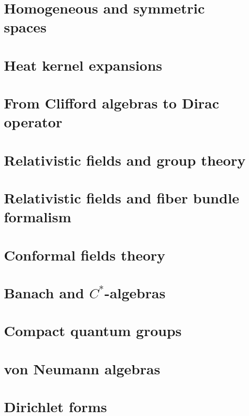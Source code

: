 \documentclass[a4paper,twoside,11pt]{book}
\begin{document}
\chapter{Homogeneous and symmetric spaces}




\chapter{Heat kernel expansions}


\chapter{From Clifford algebras to Dirac operator}



\chapter{Relativistic fields and group theory}


\chapter{Relativistic fields and fiber bundle formalism}


\chapter{Conformal fields theory}


\chapter{Banach and \texorpdfstring{$C^*$}{C*}-algebras}




\chapter{Compact quantum groups}


\chapter{von Neumann algebras}





\chapter{Dirichlet forms}

\end{document}
